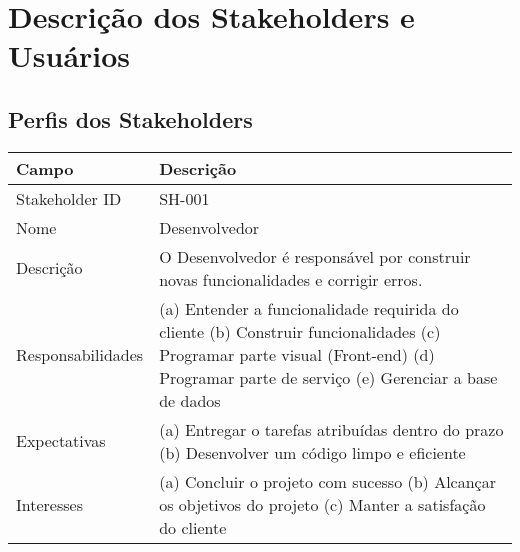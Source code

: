 \chapter{Descrição dos Stakeholders e Usuários}

\section{Perfis dos Stakeholders}

\begin{table}[htbp]
\begin{tabularx}{\textwidth}{lX}
\hline
Campo             & Descrição                                                                                                                                                                           \\ \hline
Stakeholder ID    & SH-001                                                                                                                                                                              \\ \hline
Nome              & Desenvolvedor                                                                                                                                                                       \\ \hline
Descrição         & O Desenvolvedor é responsável por construir novas funcionalidades e corrigir erros.                                                                                                  \\ \hline
Responsabilidades & (a) Entender a funcionalidade requirida do cliente (b) Construir funcionalidades (c) Programar parte visual (Front-end) (d) Programar parte de serviço (e) Gerenciar a base de dados \\ \hline
Expectativas      & (a) Entregar o tarefas atribuídas dentro do prazo (b) Desenvolver um código limpo e eficiente                                                                                   \\ \hline
Interesses        & (a) Concluir o projeto com sucesso (b) Alcançar os objetivos do projeto (c) Manter a satisfação do cliente                                                                           \\ \hline
\end{tabularx}
\end{table}   

